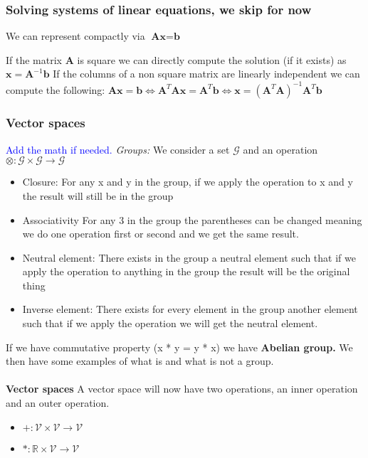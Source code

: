 \documentclass{article}
\newcommand{\tblue}[1]{\textcolor{blue}{#1}}
\begin{document}
\subsubsection{Solving systems of linear equations, we skip for now}
We can represent compactly via $\textbf{A} \textbf{x} = \textbf{b}$

If the matrix \textbf{A} is square we can directly compute the solution (if it exists) as $\textbf{x} = \textbf{A}^{-1} \textbf{b}$
If the columns of a non square matrix are linearly independent we can compute the following:
$\textbf{A} \textbf{x} = \textbf{b} \iff \textbf{A}^T \textbf{A} \textbf{x} = \textbf{A}^T \textbf{b} \iff \textbf{x} =
 (\textbf{A}^T \textbf{A})^{-1}\textbf{A}^T \textbf{b}    
$

\subsubsection{Vector spaces}
\tblue{Add the math if needed.}
\textit{Groups:} 
We consider a set $\mathcal{G}$ and an operation $ \otimes : \mathcal{G} \times \mathcal{G} \longrightarrow \mathcal{G}  $
\begin{itemize}
    \item Closure: For any x and y in the group, if we apply the operation to x and y the result will still be in the group
    \item Associativity For any 3 in the group the parentheses can be changed meaning we do one operation first or second and we get the same result.
    \item Neutral element: There exists in the group a neutral element such that if we apply the operation to anything in the group the result will be the original thing
    \item Inverse element: There exists for every element in the group another element such that if we apply the operation we will get the neutral element.
\end{itemize}
If we have commutative property (x * y = y * x) we have \textbf{Abelian group.}
We then have some examples of what is and what is not a group.
\\
\\
\textbf{Vector spaces}
A vector space will now have two operations, an inner operation and an outer operation.
\begin{itemize}
    \item  $ + : \mathcal{V} \times \mathcal{V} \longrightarrow \mathcal{V} $
    \item $* : \mathbb{R} \times \mathcal{V} \longrightarrow \mathcal{V} $
\end{itemize}
\end{document}

